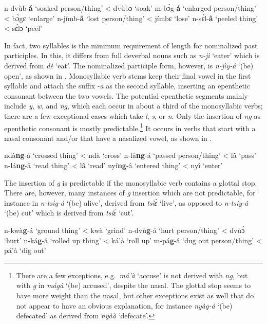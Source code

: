 \ea \label{NomPart2}
\ea  n-dvùb-{\bfseries á} `soaked person/thing' < dvùbɔ `soak'
\ex m-bɔ̀g-{\bfseries á} `enlarged person/thing' < bɔ̀gɛ `enlarge'
\ex n-jímb-{\bfseries â} `lost person/thing' < jímbɛ `lose'
\ex n-sɛ́l-{\bfseries â} `peeled thing' < sɛ́lɔ `peel'
\z
\z

In fact, two syllables is the minimum requirement of length for nominalized past participles. In this, it differs from full deverbal nouns such as {\itshape n-jì} `eater' which is derived from {\itshape dè} `eat'. The nominalized participle form, however, is {\itshape n-jìy-á} `(be) open', as shown in .  Monosyllabic verb stems keep their final vowel in the first syllable and attach the suffix -{\itshape a}  as the second syllable, inserting an epenthetic consonant between the two vowels. The potential epenthetic segments mainly include {\itshape y}, {\itshape w}, and {\itshape ng}, which each occur in about a third of the monosyllabic verbs; there are a few exceptional cases which take {\itshape l}, {\itshape s}, or {\itshape n}. Only the insertion of {\itshape ng} as epenthetic consonant is mostly predictable.\footnote{There are a few exceptions, e.g.\ {\itshape  má'à} `accuse' is not derived with {\itshape ng}, but with {\itshape g} in {\itshape mágâ} `(be) accused', despite the nasal. The glottal stop seems to have more weight than the nasal, but other exceptions exist as well that do not appear to have an obvious explanation, for instance {\itshape nyàg-á} `(be) defecated' as derived from {\itshape nyàà} `defecate'.} It occurs in verbs that start with a nasal consonant and/or that have a nasalized vowel, as shown in .

\ea \label{NomPart3}
\ea  ndà{\bfseries ng}-á `crossed thing' < ndà `cross'
\ex n-là{\bfseries ng}-á `passed person/thing' < lã̀ `pass'
\ex n-lá{\bfseries ng}-â `read thing' < lã̂ `read'
\ex nyí{\bfseries ng}-â `entered thing' < nyî `enter'
\z
\z

The insertion of {\itshape g} is predictable if the monosyllabic verb contains a glottal stop. There are, however, many instances of {\itshape g} insertion which are not predictable, for instance in {\itshape n-tsìg-á} `(be) alive', derived from {\itshape tsìɛ̀} `live', as opposed to {\itshape n-tsíy-â} `(be) cut' which is derived from {\itshape tsíɛ̀} `cut'.

\ea \label{NomPart4}
\ea  n-kwà{\bfseries g}-á `ground thing' < kwà `grind'
\ex n-dvù{\bfseries g}-á `hurt person/thing' < dvùɔ̀ `hurt'
\ex n-ká{\bfseries g}-â `rolled up thing' < ká'à `roll up'
\ex m-pá{\bfseries g}-â `dug out person/thing' < pá'à `dig out'
\z
\z

